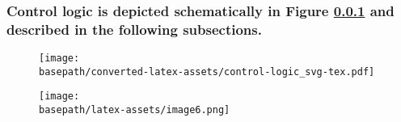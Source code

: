 \documentclass[10pt]{article}
\providecommand{\basepath}{/Users/yves/Projects/lbnl/LBL-Linkage-Widget-v2/server/src/sequence}
\begin{document}
\subsubsection{Control logic is depicted schematically in Figure \ref{figure:control_logic} and described in the following subsections.} \label{figure:control_logic}

\begin{figure}[h]
  \texttt{[image: \\basepath/converted-latex-assets/control-logic\_svg-tex.pdf]}
\end{figure}

\begin{figure}[h]
  \texttt{[image: \\basepath/latex-assets/image6.png]}
\end{figure}

\ifdefined\BuildingsTemplatesAirHandlersFansInterfacesPartialAirHandlertypFanRet
\fi
\end{document}
